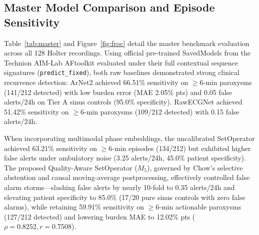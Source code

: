 \documentclass[10pt,twocolumn,letterpaper]{article}
\begin{document}
\subsection{Master Model Comparison and Episode Sensitivity}
Table~\ref{tab:master} and Figure~\ref{fig:froc} detail the master benchmark evaluation across all 128 Holter recordings. Using official pre-trained SavedModels from the Technion AIM-Lab AFtoolkit evaluated under their full contextual sequence signatures (\texttt{predict\_fixed}), both raw baselines demonstrated strong clinical recurrence detection: ArNet2 achieved 66.51\% sensitivity on $\ge 6$-min paroxysms (141/212 detected) with low burden error (MAE 2.05\% pts) and 0.05 false alerts/24h on Tier A sinus controls (95.0\% specificity). RawECGNet achieved 51.42\% sensitivity on $\ge 6$-min paroxysms (109/212 detected) with 0.15 false alerts/24h.

When incorporating multimodal phase embeddings, the uncalibrated SetOperator achieved 63.21\% sensitivity on $\ge 6$-min episodes (134/212) but exhibited higher false alerts under ambulatory noise (3.25 alerts/24h, 45.0\% patient specificity). The proposed Quality-Aware SetOperator ($M_5$), governed by Chow's selective abstention and causal moving-average postprocessing, effectively controlled false alarm storms—slashing false alerts by nearly 10-fold to 0.35 alerts/24h and elevating patient specificity to 85.0\% (17/20 pure sinus controls with zero false alarms), while retaining 59.91\% sensitivity on $\ge 6$-min actionable paroxysms (127/212 detected) and lowering burden MAE to 12.02\% pts ($\rho = 0.8252, r = 0.7508$).
\end{document}
